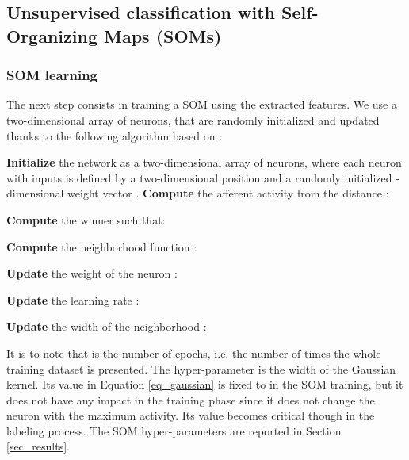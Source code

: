\documentclass[runningheads]{llncs}
\begin{document}
\subsection{Unsupervised classification with Self-Organizing Maps (SOMs)}
\subsubsection{SOM learning}
The next step consists in training a SOM using the extracted features. We use a two-dimensional array of  neurons, that are randomly initialized and updated thanks to the following algorithm based on \cite{kohonen1990som}:

\begin{algorithmic}[]
    \STATE
    \STATE \textbf{Initialize} the network as a two-dimensional array of  neurons, where each neuron  with  inputs is defined by a two-dimensional position  and a randomly initialized -dimensional weight vector .
                \STATE \textbf{Compute} the afferent activity  from the distance :
                    
                    
            \ENDFOR
        	\STATE \textbf{Compute} the winner  such that:
            	
            	\STATE \textbf{Compute} the neighborhood function :
                
                \STATE \textbf{Update} the weight  of the neuron :
                
            \ENDFOR
        \ENDFOR
        \STATE \textbf{Update} the learning rate :
        
        \STATE \textbf{Update} the width of the neighborhood :
        
	\ENDFOR
\end{algorithmic}

It is to note that  is the number of epochs, i.e. the number of times the whole training dataset is presented.
The  hyper-parameter is the width of the Gaussian kernel. Its value in Equation \ref{eq_gaussian} is fixed to  in the SOM training, but it does not have any impact in the training phase since it does not change the neuron with the maximum activity. Its value becomes critical though in the labeling process.
The SOM hyper-parameters are reported in Section \ref{sec_results}. 
\end{document}
